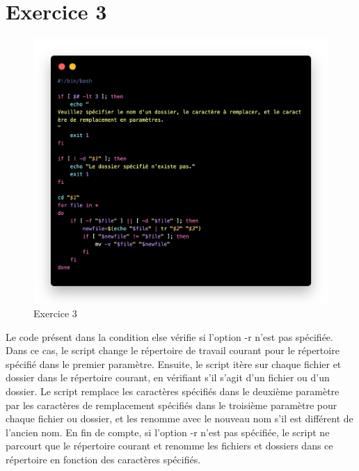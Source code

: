 \documentclass[12pt, a4paper]{article}
\begin{document}
\section{Exercice 3}
\begin{figure}[h]
    \centering
    \includegraphics[width=1\textwidth]{img/exo3.png}
    \caption{Exercice 3}
    \label{fig:scrip3}
\end{figure}
Le code présent dans la condition else vérifie si l'option -r 
n'est pas spécifiée. Dans ce cas, le script change le répertoire de 
travail courant pour le répertoire spécifié dans le premier paramètre. 
Ensuite, le script itère sur chaque fichier et dossier dans le répertoire 
courant, en vérifiant s'il s'agit d'un fichier ou d'un dossier. Le script 
remplace les caractères spécifiés dans le deuxième paramètre par les 
caractères de remplacement spécifiés dans le troisième paramètre pour 
chaque fichier ou dossier, et les renomme avec le nouveau nom s'il est 
différent de l'ancien nom. En fin de compte, si l'option -r n'est pas 
spécifiée, le script ne parcourt que le répertoire courant et renomme 
les fichiers et dossiers dans ce répertoire en fonction des caractères 
spécifiés.
\end{document}
